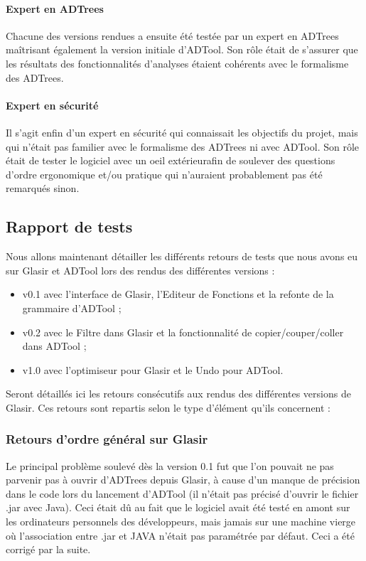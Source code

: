 \paragraph{Expert en ADTrees} Chacune des versions rendues a ensuite été testée par un expert en ADTrees maîtrisant également la version initiale d'ADTool. Son rôle était de s'assurer que les résultats des fonctionnalités d'analyses étaient cohérents avec le formalisme des ADTrees.

\paragraph{Expert en sécurité} Il s'agit enfin d'un expert en sécurité qui connaissait les objectifs du projet, mais qui n'était pas familier avec le formalisme des ADTrees ni avec ADTool. Son rôle était de tester le logiciel avec un oeil \og{}extérieur\fg afin de soulever des questions d'ordre ergonomique et/ou pratique qui n'auraient probablement pas été remarqués sinon.

\subsection{Rapport de tests}
\label{subsec:tests}

Nous allons maintenant détailler les différents retours de tests que nous avons eu sur Glasir et ADTool lors des rendus des différentes versions : 
\begin{itemize}
	\item v0.1 avec l'interface de Glasir, l'Editeur de Fonctions et la refonte de la grammaire d'ADTool ;
	\item v0.2 avec le Filtre dans Glasir et la fonctionnalité de copier/couper/coller dans ADTool ;
	\item v1.0 avec l'optimiseur pour Glasir et le Undo pour ADTool.
\end{itemize}
Seront détaillés ici les retours consécutifs aux rendus des différentes versions de Glasir. Ces retours sont repartis selon le type d'élément qu'ils concernent :

\subsubsection{Retours d'ordre général sur Glasir}
\label{subsubsec:fonctglob}

Le principal problème soulevé dès la version 0.1 fut que l'on pouvait ne pas parvenir pas à ouvrir d'ADTrees depuis Glasir, à cause d'un manque de précision dans le code lors du lancement d'ADTool (il n'était pas précisé d'ouvrir le fichier .jar avec Java). Ceci était dû au fait que le logiciel avait été testé en amont sur les ordinateurs personnels des développeurs, mais jamais sur une machine vierge où l'association entre .jar et JAVA n'était pas paramétrée par défaut. Ceci a été corrigé par la suite. 

